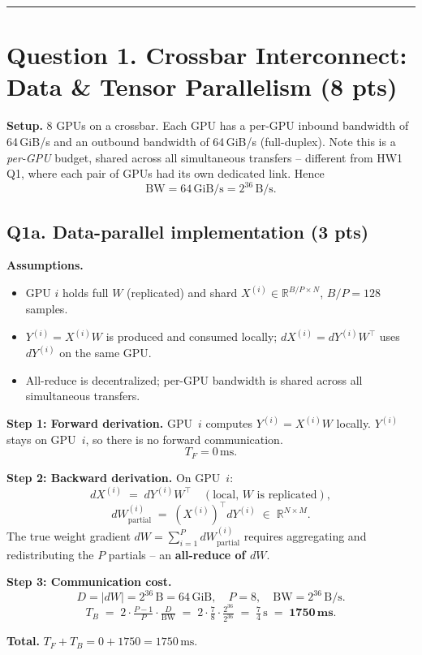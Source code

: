 \documentclass[11pt]{article}
\newcommand{\step}[1]{\noindent\textbf{#1}\quad}
\begin{document}
\vspace{4pt}\rule{\textwidth}{0.4pt}

\section*{Question 1. Crossbar Interconnect: Data \& Tensor Parallelism (8 pts)}

\textbf{Setup.} 8 GPUs on a crossbar. Each GPU has a per-GPU inbound
bandwidth of 64\,GiB/s and an outbound bandwidth of 64\,GiB/s (full-duplex).
Note this is a \emph{per-GPU} budget, shared across all simultaneous transfers --
different from HW1\,Q1, where each pair of GPUs had its own dedicated link.
Hence
\[
    \mathrm{BW} = 64\,\text{GiB/s} = 2^{36}\,\text{B/s}.
\]

\subsection*{Q1a. Data-parallel implementation (3 pts)}

\begin{stepbox}
\step{Assumptions.}
\begin{itemize}[leftmargin=*, itemsep=1pt]
    \item GPU $i$ holds full $W$ (replicated) and shard
        $X^{(i)} \in \mathbb{R}^{B/P\times N}$, $B/P = 128$ samples.
    \item $Y^{(i)} = X^{(i)} W$ is produced and consumed locally;
        $dX^{(i)} = dY^{(i)} W^{\top}$ uses $dY^{(i)}$ on the same GPU.
    \item All-reduce is decentralized; per-GPU bandwidth is shared across
        all simultaneous transfers.
\end{itemize}

\medskip
\step{Step 1: Forward derivation.}
GPU~$i$ computes $Y^{(i)} = X^{(i)} W$ locally. $Y^{(i)}$ stays on GPU~$i$,
so there is no forward communication.
\[
    T_{F} = 0\,\text{ms}.
\]

\medskip
\step{Step 2: Backward derivation.}
On GPU~$i$:
\[
    dX^{(i)} \;=\; dY^{(i)} W^{\top}
    \quad(\text{local, $W$ is replicated}),
\]
\[
    dW^{(i)}_{\text{partial}} \;=\; (X^{(i)})^{\!\top} dY^{(i)}
    \;\in\;\mathbb{R}^{N\times M}.
\]
The true weight gradient $dW = \sum_{i=1}^{P} dW^{(i)}_{\text{partial}}$
requires aggregating and redistributing the $P$ partials --
an \textbf{all-reduce of $dW$}.

\medskip
\step{Step 3: Communication cost.}
\[
    D = |dW| = 2^{36}\,\text{B} = 64\,\text{GiB},
    \quad P = 8,
    \quad \mathrm{BW} = 2^{36}\,\text{B/s}.
\]
\[
    T_{B} \;=\; 2 \cdot \tfrac{P-1}{P} \cdot \tfrac{D}{\mathrm{BW}}
            \;=\; 2 \cdot \tfrac{7}{8} \cdot \tfrac{2^{36}}{2^{36}}
            \;=\; \tfrac{7}{4}\,\text{s}
            \;=\; \mathbf{1750\,\text{ms}}.
\]

\medskip
\step{Total.} $T_{F} + T_{B} = 0 + 1750 = \boxed{1750\,\text{ms}}.$
\end{stepbox}
\end{document}

